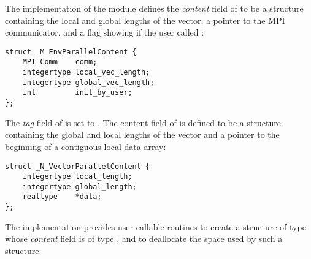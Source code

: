 %
The {\nvecp} implementation of the {\nvector} module
defines the {\em content} field of  to be a structure 
containing the local and global lengths of the vector, a pointer to the MPI
communicator, and a flag showing if the user called :
\begin{verbatim}
struct _M_EnvParallelContent {
    MPI_Comm    comm;
    integertype local_vec_length;
    integertype global_vec_length;
    int         init_by_user;
};
\end{verbatim}
The {\em tag} field of  is set to .
The content field of  is defined to be a structure containing
the global and local lengths of the vector and a pointer to the beginning 
of a contiguous local data array:
\begin{verbatim} 
struct _N_VectorParallelContent {
    integertype local_length;
    integertype global_length;
    realtype    *data;
};
\end{verbatim}

The {\nvecp} implementation provides user-callable routines  
to create a structure of type  whose {\em content} field is
of type , and  
to deallocate the space used by such a structure. 

